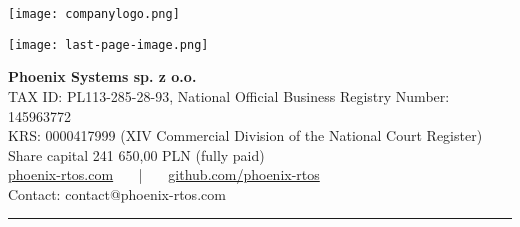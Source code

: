 %
%
%
%

\clearpage
\thispagestyle{empty}

\begin{flushleft}
    \texttt{[image: companylogo.png]}
\end{flushleft}


\vspace{2.5cm}

\begin{flushright}
	\texttt{[image: last-page-image.png]}
\end{flushright}

\vspace{1cm}

{\setmainfont{Liberation Sans}
\color{ps-darkblue}
\begin{flushright}
	{\fontsize{13}{24}\selectfont \textbf{Phoenix Systems sp. z o.o.}\\}
	{\fontsize{10}{16}\selectfont TAX ID: PL113-285-28-93, National Official Business Registry Number: 145963772\\
					KRS: 0000417999 (XIV Commercial Division of the National Court Register)\\
					Share capital 241 650,00 PLN (fully paid)\\}
	\vspace{0.6cm}
	\hypersetup{colorlinks=true, urlcolor=ps-darkblue}
	{\fontsize{10}{16}\selectfont
		\href{https://phoenix-rtos.com}{phoenix-rtos.com}
		~~~|~~~
		\href{https://github.com/phoenix-rtos}{github.com/phoenix-rtos}\\
	}
	{\fontsize{10}{12}\selectfont Contact: contact@phoenix-rtos.com}
\end{flushright}

\vspace{\fill}

\noindent
{}}

\vspace{0.4cm}

\begin{center}
	\color{ps-orange}\rule{\textwidth}{2pt}
\end{center}